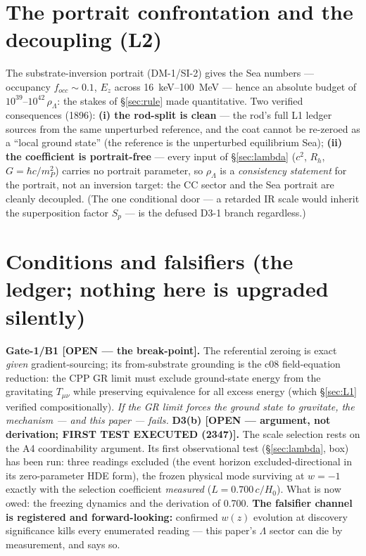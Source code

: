 \documentclass[11pt]{article}
\newcommand{\rL}{\rho_\Lambda}
\newcommand{\Rh}{R_h}
\begin{document}
\section{The portrait confrontation and the decoupling (L2)}
\label{sec:L2}
The substrate-inversion portrait (DM-1/SI-2) gives the Sea numbers --- occupancy $f_{occ}\sim0.1$,
$E_z$ across 16~keV--100~MeV --- hence an absolute budget of $10^{39}$--$10^{42}\,\rL$: the stakes of
\S\ref{sec:rule} made quantitative. Two verified consequences (1896): \textbf{(i) the rod-split is
clean} --- the rod's full L1 ledger sources from the same unperturbed reference, and the coat cannot
be re-zeroed as a ``local ground state'' (the reference is the unperturbed equilibrium Sea);
\textbf{(ii) the coefficient is portrait-free} --- every input of \S\ref{sec:lambda} ($c^2$, $\Rh$,
$G = \hbar c/m_P^2$) carries no portrait parameter, so $\rL$ is a \emph{consistency statement} for
the portrait, not an inversion target: the CC sector and the Sea portrait are cleanly decoupled. (The
one conditional door --- a retarded IR scale would inherit the superposition factor $S_p$ --- is the
defused D3-1 branch regardless.)

\section{Conditions and falsifiers (the ledger; nothing here is upgraded silently)}
\label{sec:conditions}
\textbf{Gate-1/B1 [OPEN --- the break-point].} The referential zeroing is exact \emph{given}
gradient-sourcing; its from-substrate grounding is the c08 field-equation reduction: the CPP GR limit
must exclude ground-state energy from the gravitating $T_{\mu\nu}$ while preserving equivalence for
all excess energy (which \S\ref{sec:L1} verified compositionally). \emph{If the GR limit forces the
ground state to gravitate, the mechanism --- and this paper --- fails.}
\textbf{D3(b) [OPEN --- argument, not derivation; FIRST TEST EXECUTED (2347)].} The scale selection
rests on the A4 coordinability argument. Its first observational test (\S\ref{sec:lambda}, box) has
been run: three readings excluded (the event horizon excluded-directional in its zero-parameter HDE
form), the frozen physical mode surviving at $w=-1$ exactly with the selection coefficient
\emph{measured} ($L = 0.700\,c/H_0$). What is now owed: the freezing dynamics and the derivation of
0.700. \textbf{The falsifier channel is registered and forward-looking:} confirmed $w(z)$ evolution
at discovery significance kills every enumerated reading --- this paper's $\Lambda$ sector can die by
measurement, and says so.
\end{document}
